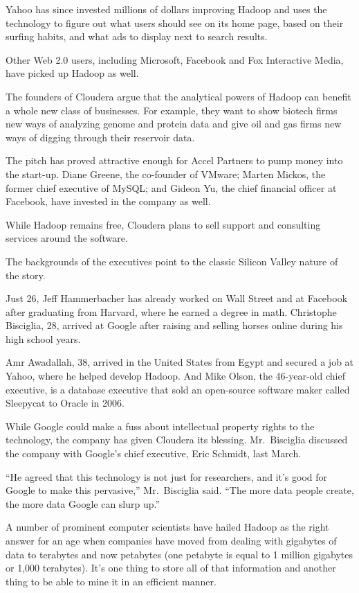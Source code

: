 \documentclass[12pt,a4paper,onecolumn]{article}
\begin{document}
\begin{CJK*}{GBK}{song}
Yahoo has since invested millions of dollars improving Hadoop and uses the technology to figure out
what users should see on its home page, based on their surfing habits, and what ads to display next
to search results.

Other Web 2.0 users, including Microsoft, Facebook and Fox Interactive Media, have picked up Hadoop
as well.

The founders of Cloudera argue that the analytical powers of Hadoop can benefit a whole new class of
businesses. For example, they want to show biotech firms new ways of analyzing genome and protein
data and give oil and gas firms new ways of digging through their reservoir data.

The pitch has proved attractive enough for Accel Partners to pump money into the start-up. Diane
Greene, the co-founder of VMware; Marten Mickos, the former chief executive of MySQL; and Gideon Yu,
the chief financial officer at Facebook, have invested in the company as well.

While Hadoop remains free, Cloudera plans to sell support and consulting services around the
software.

The backgrounds of the executives point to the classic Silicon Valley nature of the story.

Just 26, Jeff Hammerbacher has already worked on Wall Street and at Facebook after graduating from
Harvard, where he earned a degree in math. Christophe Bisciglia, 28, arrived at Google after raising
and selling horses online during his high school years.

Amr Awadallah, 38, arrived in the United States from Egypt and secured a job at Yahoo, where he
helped develop Hadoop. And Mike Olson, the 46-year-old chief executive, is a database executive that
sold an open-source software maker called Sleepycat to Oracle in 2006.

While Google could make a fuss about intellectual property rights to the technology, the company has
given Cloudera its blessing. Mr.~Bisciglia discussed the company with Google's chief executive, Eric
Schmidt, last March.

``He agreed that this technology is not just for researchers, and it's good for Google to make this
pervasive,'' Mr.~Bisciglia said. ``The more data people create, the more data Google can slurp up.''

A number of prominent computer scientists have hailed Hadoop as the right answer for an age when
companies have moved from dealing with gigabytes of data to terabytes and now petabytes (one
petabyte is equal to 1 million gigabytes or 1,000 terabytes). It's one thing to store all of that
information and another thing to be able to mine it in an efficient manner.


\end{CJK*}
\end{document}

